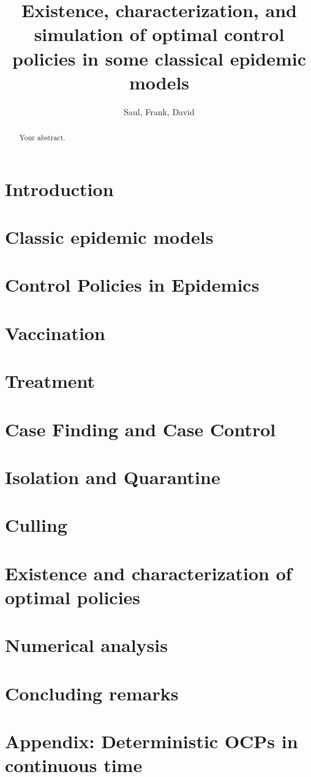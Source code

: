 \documentclass[a4paper]{amsart}
\title[%
	Existence, characterization and simulation of OCP for some epidemic 
	Models%
	]{
	Existence, characterization, and simulation
	of optimal control policies in some classical epidemic models
}
\author{Saul, Frank, David}
\begin{document}
	\maketitle
  \begin{abstract}
  	Your abstract.
  \end{abstract}
%
%
  \section{Introduction}
    
  
  \section{Classic epidemic models}
    
  \section{Control Policies in Epidemics}
    
  \section{Vaccination}
    
  \section{Treatment}
    
  \section{Case Finding and Case Control}
    
  \section{Isolation and Quarantine}
    
  \section{Culling}
    
 
 
  \section{Existence and characterization of optimal policies}
 
 
 
  \section{Numerical analysis}
    
 
  \section{Concluding remarks}

\section{Appendix: Deterministic OCPs in continuous time}

    
%
%

  
  
\end{document}
